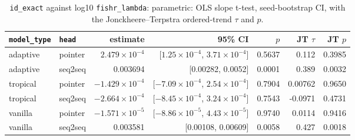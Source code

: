 \documentclass[10pt]{article}
\begin{document}
{\small
\begin{longtable}{llrrrrr}
\caption{\texttt{id\_exact} against log10 \texttt{fishr\_lambda}: parametric: OLS slope t-test, seed-bootstrap CI, with the Jonckheere--Terpstra ordered-trend $\tau$ and $p$.}\label{tab:trend-id_exact}\\
\toprule
\texttt{model\_type} & \texttt{head} & estimate & 95\% CI & $p$ & JT $\tau$ & JT $p$\\
\midrule
\endhead
adaptive & pointer & $2.479\times10^{-4}$ & [$1.25\times10^{-4}$, $3.71\times10^{-4}$] & 0.5637 & 0.112 & 0.3985\\
adaptive & seq2seq & 0.003694 & [0.00282, 0.0052] & 0.0001 & 0.389 & 0.0032\\
tropical & pointer & $-1.429\times10^{-4}$ & [$-7.09\times10^{-4}$, $2.54\times10^{-4}$] & 0.7904 & 0.00762 & 0.9650\\
tropical & seq2seq & $-2.664\times10^{-4}$ & [$-8.45\times10^{-4}$, $3.24\times10^{-4}$] & 0.7543 & -0.0971 & 0.4731\\
vanilla & pointer & $-1.571\times10^{-5}$ & [$-8.86\times10^{-5}$, $4.43\times10^{-5}$] & 0.9740 & 0.0114 & 0.9416\\
vanilla & seq2seq & 0.003581 & [0.00108, 0.00609] & 0.0058 & 0.427 & 0.0018\\
\bottomrule
\end{longtable}
}
\end{document}
